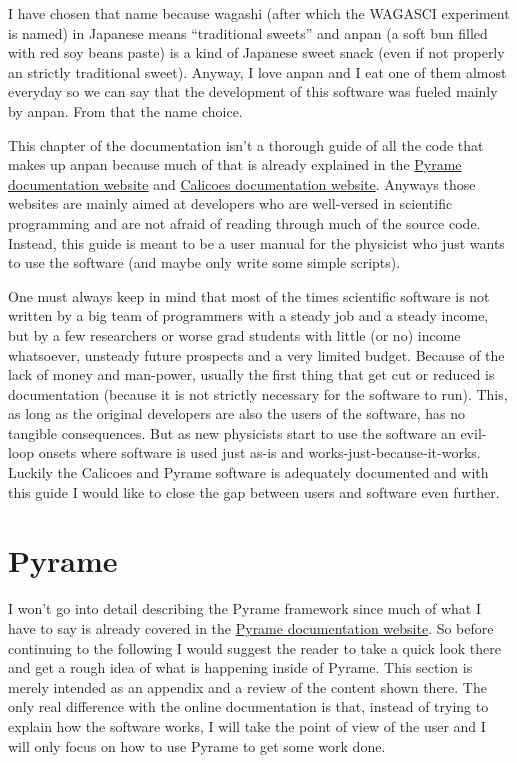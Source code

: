 I have chosen that name because wagashi (after which the WAGASCI
experiment is named) in Japanese means ``traditional sweets'' and
anpan (a soft bun filled with red soy beans paste) is a kind of
Japanese sweet snack (even if not properly an strictly traditional
sweet). Anyway, I love anpan and I eat one of them almost everyday so
we can say that the development of this software was fueled mainly by
anpan. From that the name choice.

This chapter of the documentation isn't a thorough guide of all the
code that makes up anpan because much of that is already explained in
the \href{http://llr.in2p3.fr/sites/pyrame/documentation/}{Pyrame
  documentation website} and
\href{http://llr.in2p3.fr/sites/pyrame/calicoes/documentation/}{Calicoes
  documentation website}. Anyways those websites are mainly aimed at
developers who are well-versed in scientific programming and are not
afraid of reading through much of the source code. Instead, this guide
is meant to be a user manual for the physicist who just wants to use
the software (and maybe only write some simple scripts).

One must always keep in mind that most of the times scientific
software is not written by a big team of programmers with a steady job
and a steady income, but by a few researchers or worse grad students
with little (or no) income whatsoever, unsteady future prospects and a
very limited budget. Because of the lack of money and man-power,
usually the first thing that get cut or reduced is documentation
(because it is not strictly necessary for the software to run). This,
as long as the original developers are also the users of the software,
has no tangible consequences. But as new physicists start to use the
software an evil-loop onsets where software is used just as-is and
works-just-because-it-works. Luckily the Calicoes and Pyrame software
is adequately documented and with this guide I would like to close the
gap between users and software even further.

\section{Pyrame}
I won't go into detail describing the Pyrame framework since much of
what I have to say is already covered in the
\href{http://llr.in2p3.fr/sites/pyrame/documentation/}{Pyrame
  documentation website}. So before continuing to the following I
would suggest the reader to take a quick look there and get a rough
idea of what is happening inside of Pyrame. This section is merely
intended as an appendix and a review of the content shown there. The
only real difference with the online documentation is that, instead of
trying to explain how the software works, I will take the point of
view of the user and I will only focus on how to use Pyrame to get
some work done.


